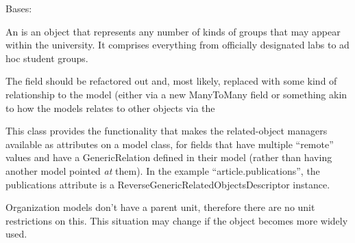 \documentclass[letterpaper,10pt,english]{sphinxmanual}
\begin{document}
\begin{fulllineitems}
\label{generated/apps.profiles.models:apps.profiles.models.Organization}
Bases: {\hyperref[generated/apps.profiles.models:apps.profiles.models.BaseModel]{}}

An  is an object that represents any number of kinds of groups
that may appear within the university.  It comprises everything from officially
designated labs to ad hoc student groups.

The  field should be refactored out and, most likely, replaced with
some kind of relationship to the  model (either via a new ManyToMany field
or something akin to how the  models relates to other objects via the


\begin{fulllineitems}
\label{generated/apps.profiles.models:apps.profiles.models.Organization.affiliations}
This class provides the functionality that makes the related-object
managers available as attributes on a model class, for fields that have
multiple ``remote'' values and have a GenericRelation defined in their model
(rather than having another model pointed \emph{at} them). In the example
``article.publications'', the publications attribute is a
ReverseGenericRelatedObjectsDescriptor instance.

\end{fulllineitems}



\begin{fulllineitems}
\label{generated/apps.profiles.models:apps.profiles.models.Organization.has_unit_permission}
Organization models don't have a parent unit, therefore there are no unit 
restrictions on this.  This situation may change if the 
object becomes more widely used.

\end{fulllineitems}




\end{fulllineitems}
\end{document}
